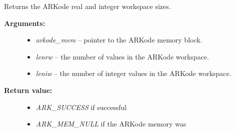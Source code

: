 \documentclass[letterpaper,10pt,english]{sphinxmanual}
\begin{document}
\begin{fulllineitems}
\label{c_interface/User_callable:ARKodeGetWorkSpace}
Returns the ARKode real and integer workspace sizes.
\begin{description}
\item[{\textbf{Arguments:}}] \leavevmode\begin{itemize}
\item {} 
\emph{arkode\_mem} -- pointer to the ARKode memory block.

\item {} 
\emph{lenrw} -- the number of  values in the ARKode workspace.

\item {} 
\emph{leniw} -- the number of integer values in the ARKode workspace.

\end{itemize}

\item[{\textbf{Return value:}}] \leavevmode\begin{itemize}
\item {} 
\emph{ARK\_SUCCESS} if successful

\item {} 
\emph{ARK\_MEM\_NULL} if the ARKode memory was 

\end{itemize}

\end{description}

\end{fulllineitems}

\end{document}
